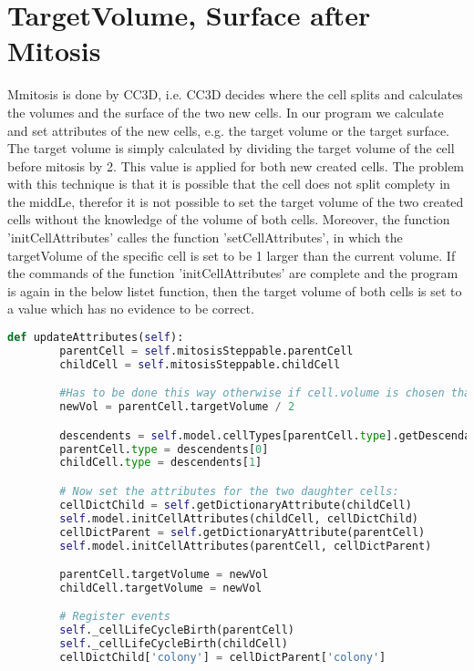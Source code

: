 \section{TargetVolume, Surface after Mitosis}
Mmitosis is done by \ac{CC3D}, i.e. \ac{CC3D} decides where the cell splits and calculates the volumes and the surface of the two new cells. In our program we calculate and set attributes of the new cells, e.g. the target volume or the target surface. The target volume is simply calculated by dividing the target volume of the cell before mitosis by 2. This value is applied for both new created cells. The problem with this technique is that it is possible that the cell does not split complety in the middLe, therefor it is not possible to set the target volume of the two created cells without the knowledge of the volume of both cells. Moreover, the function 'initCellAttributes' calles the function 'setCellAttributes', in which the targetVolume of the specific cell is set to be 1 larger than the current volume. If the commands of the function 'initCellAttributes' are complete and the program is again in the below listet function, then the target volume of both cells is set to a value which has no evidence to be correct.
\begin{lstlisting}[language=Python, caption =two cells are created by mitosis where the target volume is set at a wrong place]
    def updateAttributes(self):
        parentCell = self.mitosisSteppable.parentCell
        childCell = self.mitosisSteppable.childCell

        #Has to be done this way otherwise if cell.volume is chosen than it disappears
        newVol = parentCell.targetVolume / 2

        descendents = self.model.cellTypes[parentCell.type].getDescendants()
        parentCell.type = descendents[0]
        childCell.type = descendents[1]

        # Now set the attributes for the two daughter cells:
        cellDictChild = self.getDictionaryAttribute(childCell)
        self.model.initCellAttributes(childCell, cellDictChild)
        cellDictParent = self.getDictionaryAttribute(parentCell)
        self.model.initCellAttributes(parentCell, cellDictParent)

        parentCell.targetVolume = newVol
        childCell.targetVolume = newVol

        # Register events
        self._cellLifeCycleBirth(parentCell)
        self._cellLifeCycleBirth(childCell)
		cellDictChild['colony'] = cellDictParent['colony']
\end{lstlisting}
